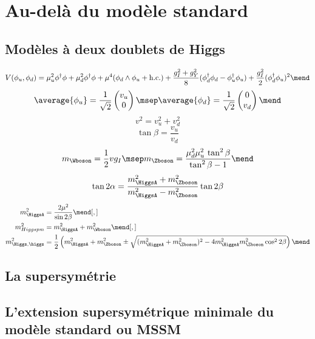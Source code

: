\section{Au-delà du modèle standard}\label{chapter-MS-MSSM-section-BSM}
\subsection{Modèles à deux doublets de Higgs}\label{chapter-MS-MSSM-section-BSM-subsec-dbl_H_dbl}
\begin{equation}
V(\phi_u,\phi_d)
=
\mu_u^2\phi^\dagger\phi
+
\mu_d^2\phi^\dagger\phi
+
\mu^4 (\phi_d\wedge\phi_u+\text{h.c.})
+
\frac{g_I^2+g_Y^2}{8} (\phi_d^\dagger\phi_d-\phi_u^\dagger\phi_u)
+
\frac{g_I^2}{2} (\phi_d^\dagger\phi_u)^2
\mend
\end{equation}
\begin{equation}
\average{\phi_u} = \frac{1}{\sqrt{2}} \begin{pmatrix}v_u \\ 0 \end{pmatrix}
\msep
\average{\phi_d} = \frac{1}{\sqrt{2}} \begin{pmatrix} 0\\ v_d \end{pmatrix}
\mend
\end{equation}
\begin{equation}
v^2 = v_u^2 + v_d^2
\end{equation}
\begin{equation}
\tan\beta = \frac{v_u}{v_d}
\end{equation}
\begin{equation}
m_{\Wboson} = \frac{1}{2} v g_I
\msep
m_{\Zboson} = \frac{\mu_d^2\mu_u^2 \, \tan^2\beta}{\tan^2\beta-1}
\mend
\end{equation}
\begin{equation}
\tan 2\alpha = \frac{m_{\HiggsA}^2+m_{\Zboson}^2}{m_{\HiggsA}^2-m_{\Zboson}^2} \tan 2\beta
\end{equation}
\begin{align}
m_{\HiggsA}^2 &= \frac{2\mu^2}{\sin 2\beta}
\mend[,]\\
m_{Higgspm}^2 &= m_{\HiggsA}^2+m_{\Wboson}^2
\mend[,]\\
m_{\Higgs,\higgs}^2 &= \frac{1}{2} \left( m_{\HiggsA}^2+m_{\Zboson}^2 \pm \sqrt{(m_{\HiggsA}^2+m_{\Zboson}^2)^2-4m_{\HiggsA}^2m_{\Zboson}^2\cos^2 2\beta} \right)
\mend
\end{align}
\subsection{La supersymétrie}\label{chapter-MS-MSSM-section-BSM-subsec-SUSY}
\subsection{L'extension supersymétrique minimale du modèle standard ou MSSM}\label{chapter-MS-MSSM-section-BSM-subsec-MSSM}

